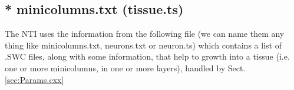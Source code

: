 


\subsection{* minicolumns.txt (tissue.ts)}
\label{sec:tissue-file}

The NTI uses the information from the following file (we can name them
any thing like minicolumns.txt, neurons.txt or neuron.ts) which contains a list of .SWC
files, along with some information, that help to growth into a tissue (i.e.
one or more minicolumns, in one or more layers), handled by
Sect.\ref{sec:Params.cxx}

